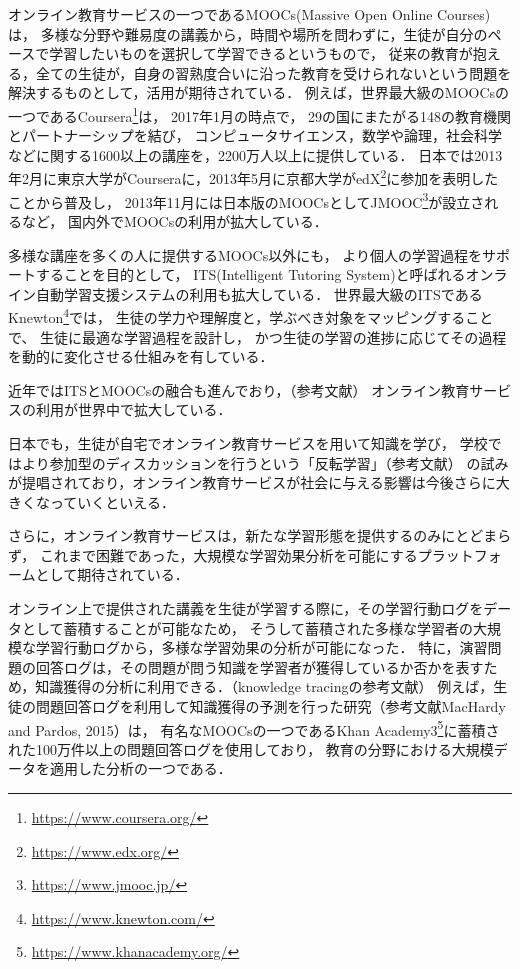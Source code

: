 オンライン教育サービスの一つであるMOOCs(Massive Open Online Courses)は，
多様な分野や難易度の講義から，時間や場所を問わずに，生徒が自分のペースで学習したいものを選択して学習できるというもので，
従来の教育が抱える，全ての生徒が，自身の習熟度合いに沿った教育を受けられないという問題を解決するものとして，活用が期待されている．
例えば，世界最大級のMOOCsの一つであるCoursera\footnote{\url{https://www.coursera.org/}}は，
2017年1月の時点で，
29の国にまたがる148の教育機関とパートナーシップを結び，
コンピュータサイエンス，数学や論理，社会科学などに関する1600以上の講座を，2200万人以上に提供している．
日本では2013年2月に東京大学がCourseraに，2013年5月に京都大学がedX\footnote{\url{https://www.edx.org/}}に参加を表明したことから普及し，
2013年11月には日本版のMOOCsとしてJMOOC\footnote{\url{https://www.jmooc.jp/}}が設立されるなど，
国内外でMOOCsの利用が拡大している．

多様な講座を多くの人に提供するMOOCs以外にも，
より個人の学習過程をサポートすることを目的として，
ITS(Intelligent Tutoring System)と呼ばれるオンライン自動学習支援システムの利用も拡大している．
世界最大級のITSであるKnewton\footnote{\url{https://www.knewton.com/}}では，
生徒の学力や理解度と，学ぶべき対象をマッピングすることで、
生徒に最適な学習過程を設計し，
かつ生徒の学習の進捗に応じてその過程を動的に変化させる仕組みを有している．

近年ではITSとMOOCsの融合も進んでおり，（参考文献）
オンライン教育サービスの利用が世界中で拡大している．

日本でも，生徒が自宅でオンライン教育サービスを用いて知識を学び，
学校ではより参加型のディスカッションを行うという「反転学習」（参考文献）
の試みが提唱されており，オンライン教育サービスが社会に与える影響は今後さらに大きくなっていくといえる．


さらに，オンライン教育サービスは，新たな学習形態を提供するのみにとどまらず，
これまで困難であった，大規模な学習効果分析を可能にするプラットフォームとして期待されている．

オンライン上で提供された講義を生徒が学習する際に，その学習行動ログをデータとして蓄積することが可能なため，
そうして蓄積された多様な学習者の大規模な学習行動ログから，多様な学習効果の分析が可能になった．
特に，演習問題の回答ログは，その問題が問う知識を学習者が獲得しているか否かを表すため，知識獲得の分析に利用できる．（knowledge tracingの参考文献）
例えば，生徒の問題回答ログを利用して知識獲得の予測を行った研究（参考文献MacHardy and Pardos, 2015）は，
有名なMOOCsの一つであるKhan Academy3\footnote{\url{https://www.khanacademy.org/}}に蓄積された100万件以上の問題回答ログを使用しており，
教育の分野における大規模データを適用した分析の一つである．



